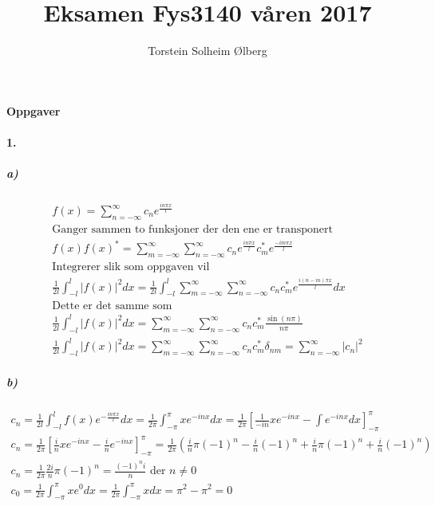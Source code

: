\documentclass[11pt, A4paper,norsk]{article}
\author{Torstein Solheim Ølberg}
\title{Eksamen Fys3140 våren 2017}
\begin{document}
\maketitle
	\begin{center}
\Large \textbf{Oppgaver}
	\end{center}









		\paragraph{1.}
			\subparagraph{a)}
			\begin{gather*}
f(x) = \sum_{n = - \infty}^{\infty} c_n e^{\frac{i n\pi x}{l}} \\
\text{Ganger sammen to funksjoner der den ene er transponert} \\
f(x) f(x)^{*} = \sum_{m = - \infty}^{\infty} \sum_{n = - \infty}^{\infty} c_n e^{\frac{i n\pi x}{l}} c_m^{*} e^{\frac{- i m\pi x}{l}} \\
\text{Integrerer slik som oppgaven vil} \\
\frac{1}{2l} \int_{-l}^{l} |f(x)|^2 dx = \frac{1}{2l} \int_{-l}^{l} \sum_{m = - \infty}^{\infty} \sum_{n = - \infty}^{\infty} c_n c_m^{*} e^{\frac{i (n - m)\pi x}{l}} dx \\
\text{Dette er det samme som} \\
\frac{1}{2l} \int_{-l}^{l} |f(x)|^2 dx = \sum_{m = - \infty}^{\infty} \sum_{n = - \infty}^{\infty} c_n c_m^{*} \frac{\sin(n \pi)}{n \pi} \\
\frac{1}{2l} \int_{-l}^{l} |f(x)|^2 dx = \sum_{m = - \infty}^{\infty} \sum_{n = - \infty}^{\infty} c_n c_m^{*} \delta_{nm} = \sum_{n = - \infty}^{\infty} |c_n|^2
			\end{gather*}









			\subparagraph{b)}
				\begin{gather*}
c_n = \frac{1}{2 l} \int_{- l}^{l} f(x) e^{- \frac{i n\pi x}{l}} dx = \frac{1}{2 \pi} \int_{- \pi}^{\pi} x e^{- i n x} dx = \frac{1}{2 \pi} \left[ \frac{1}{- i n} x e^{- i n x} - \int e^{- i n x} dx \right]_{- \pi}^{\pi} \\
c_n = \frac{1}{2 \pi} \left[ \frac{i}{n} x e^{- i n x} - \frac{i}{n} e^{- i n x} \right]_{- \pi}^{\pi} = \frac{1}{2 \pi} \left( \frac{i}{n} \pi (-1)^{n} - \frac{i}{n} (-1)^{n} + \frac{i}{n} \pi (-1)^{n} + \frac{i}{n} (-1)^{n} \right) \\
c_n = \frac{1}{2 \pi} \frac{2 i}{n} \pi (-1)^{n} = \frac{(-1)^{n} i}{n} \text{ der $n \neq 0$} \\
c_0 = \frac{1}{2 \pi} \int_{- \pi}^{\pi} x e^{0} dx = \frac{1}{2 \pi} \int_{- \pi}^{\pi} x dx = \pi^2 - \pi^2 = 0
				\end{gather*}
\end{document}

